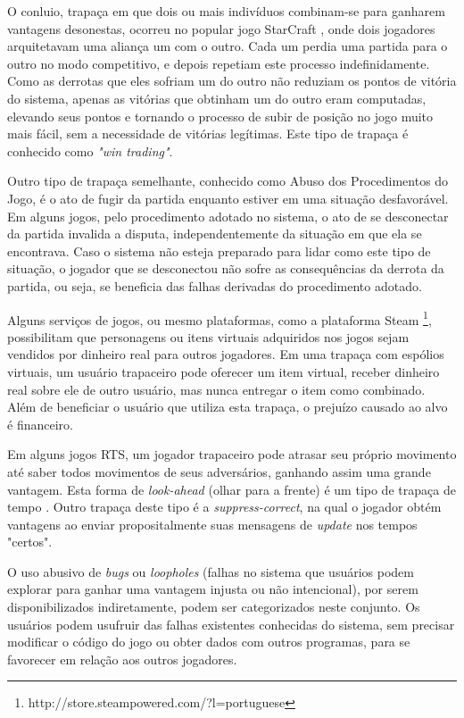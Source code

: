 O conluio, trapaça em que dois ou mais indivíduos combinam-se para ganharem vantagens desonestas, ocorreu no popular jogo StarCraft \cite{starcraft}, onde dois jogadores arquitetavam uma aliança um com o outro. Cada um perdia uma partida para o outro no modo competitivo, e depois repetiam este processo indefinidamente. Como as derrotas que eles sofriam um do outro não reduziam os pontos de vitória do sistema, apenas as vitórias que obtinham um do outro eram computadas, elevando seus pontos e tornando o processo de subir de posição no jogo muito mais fácil, sem a necessidade de vitórias legítimas. Este tipo de trapaça é conhecido como \textit{"win trading"}.

Outro tipo de trapaça semelhante, conhecido como Abuso dos Procedimentos do Jogo, é o ato de fugir da partida enquanto estiver em uma situação desfavorável. Em alguns jogos, pelo procedimento adotado no sistema, o ato de se desconectar da partida invalida a disputa, independentemente da situação em que ela se encontrava. Caso o sistema não esteja preparado para lidar como este tipo de situação, o jogador que se desconectou não sofre as consequências da derrota da partida, ou seja, se beneficia das falhas derivadas do procedimento adotado.

Alguns serviços de jogos, ou mesmo plataformas, como a plataforma Steam \footnote{http://store.steampowered.com/?l=portuguese}, possibilitam que personagens ou itens virtuais adquiridos nos jogos sejam vendidos por dinheiro real para outros jogadores. Em uma trapaça com espólios virtuais, um usuário trapaceiro pode oferecer um item virtual, receber dinheiro real sobre ele de outro usuário, mas nunca entregar o item como combinado. Além de beneficiar o usuário que utiliza esta trapaça, o prejuízo causado ao alvo é financeiro. 

Em alguns jogos RTS, um jogador trapaceiro pode atrasar seu próprio movimento até saber todos movimentos de seus adversários, ganhando assim uma grande vantagem. Esta forma de \textit{look-ahead} (olhar para a frente) é um tipo de trapaça de tempo \cite{cheat-proof}. Outro trapaça deste tipo é a \textit{suppress-correct}, na qual o jogador obtém vantagens ao enviar propositalmente suas mensagens de \textit{update} nos tempos "certos". 

O uso abusivo de \textit{bugs} ou \textit{loopholes} (falhas no sistema que usuários podem explorar para ganhar uma vantagem injusta ou não intencional), por serem disponibilizados indiretamente,  podem ser categorizados neste conjunto. Os usuários podem usufruir das falhas existentes conhecidas do sistema, sem precisar modificar o código do jogo ou obter dados com outros programas, para se favorecer em relação aos outros jogadores.



